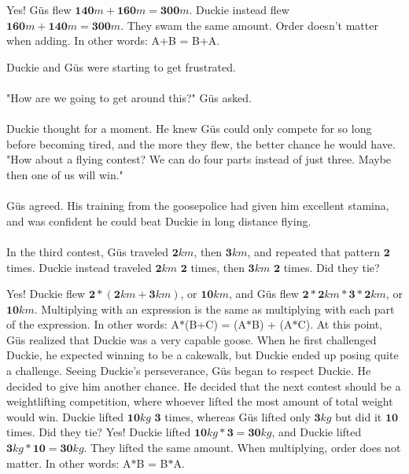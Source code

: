 {Yes! Güs flew $\mathbf{140} m + \mathbf{160} m = \mathbf{300} m$. Duckie instead flew $\mathbf{160} m + \mathbf{140} m = \mathbf{300} m$. They swam the same amount.}
{Order doesn't matter when adding. In other words: A+B = B+A.}
{}
{Duckie and Güs were starting to get frustrated. 
\paragraph{} "How are we going to get around this?" Güs asked.
\paragraph{} Duckie thought for a moment. He knew Güs could only compete for so long before becoming tired, and the more they flew, the better chance he would have. "How about a flying contest? We can do four parts instead of just three. Maybe then one of us will win."
\paragraph{} Güs agreed. His training from the goosepolice had given him excellent stamina, and was confident he could beat Duckie in long distance flying. 
\paragraph{} In the third contest, Güs traveled $\mathbf{2} km$, then $\mathbf{3} km$, and repeated that pattern $\mathbf{2}$ times. Duckie instead traveled $\mathbf{2} km$ $\mathbf{2}$ times, then $\mathbf{3} km$ $\mathbf{2}$ times. Did they tie?}
{Yes! Duckie flew $\mathbf{2}\ast(\mathbf{2} km + \mathbf{3} km)$, or $\mathbf{10} km$, and Güs flew $\mathbf{2}\ast\mathbf{2} km \ast \mathbf{3}\ast\mathbf{2} km$, or $\mathbf{10}km$.}
{Multiplying with an expression is the same as multiplying with each part of the expression. In other words: A$\ast$(B+C) = (A$\ast$B) + (A$\ast$C).}
{}
{At this point, Güs realized that Duckie was a very capable goose. When he first challenged Duckie, he expected winning to be a cakewalk, but Duckie ended up posing quite a challenge. Seeing Duckie's perseverance, Güs began to respect Duckie. He decided to give him another chance. He decided that the next contest should be a weightlifting competition, where whoever lifted the most amount of total weight would win. Duckie lifted $\mathbf{10} kg$  $\mathbf{3}$ times, whereas Güs lifted only $\mathbf{3} kg$ but did it $\mathbf{10}$ times. Did they tie?}
{Yes! Duckie lifted $\mathbf{10}kg\ast\mathbf{3}=\mathbf{30}kg$, and Duckie lifted $\mathbf{3}kg \ast \mathbf{10}=\mathbf{30}kg$. They lifted the same amount.}
{When multiplying, order does not matter. In other words: A$\ast$B = B$\ast$A.}
{}

